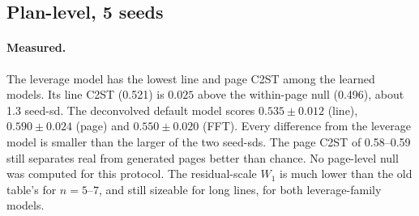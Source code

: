 \documentclass[11pt,a4paper]{article}
\newcommand{\src}[1]{{\footnotesize\texttt{#1}}}
\begin{document}
\subsection{Plan-level, 5 seeds}
\begin{table}[H]\centering
{}
\caption{Plan-level comparison on the test split (193 pages, 1495 lines). The
v1 and old-table line and page C2ST values match \src{runs/eval/ablation.md}
(\texttt{learned\_full}, \texttt{v2\_history\_unfit}). The leverage row, the
FFT column and the residual-scale bins come from
\src{runs/compare\_unfitw/compare\_5seed.py} (5 seeds; output in
\src{runs/compare\_unfitw/compare\_5seed.txt}); the deconvolved row comes from
\src{runs/compare\_unfitw/compare\_5seed\_dc.py} (output in
\src{compare\_5seed\_dc.txt}). Bold: the current default. The FFT floor (real
halves) is 0.483 for logistic regression and 0.522 for the MLP.}
\label{tab:plan}
\end{table}

\paragraph{Measured.} The leverage model has the lowest line and page C2ST
among the learned models. Its line C2ST (0.521) is $0.025$ above the
within-page null (0.496), about 1.3 seed-sd. The deconvolved default model
scores $0.535\pm0.012$ (line), $0.590\pm0.024$ (page) and $0.550\pm0.020$
(FFT). Every difference from the leverage model is smaller than the larger
of the two seed-sds. The page C2ST of 0.58--0.59 still separates real from
generated pages better than chance. No page-level null was computed for this
protocol. The residual-scale $W_1$ is much lower than the old table's for
$n=5$--$7$, and still sizeable for long lines, for both leverage-family
models.
\end{document}
